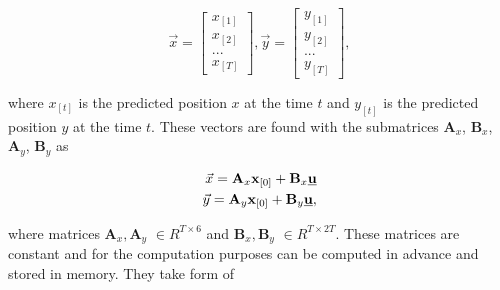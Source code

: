 \documentclass{article}
\begin{document}
\begin{equation}
\vec{x} =
  \begin{bmatrix}
  x_{[1]} \\
  x_{[2]} \\
  ...	   \\
  x_{[T]}
  \end{bmatrix},\vec{y} = \begin{bmatrix}
  y_{[1]} \\
  y_{[2]} \\
  ...	   \\
  y_{[T]}
  \end{bmatrix},
\end{equation}

where $x_{[t]}$ is the predicted position $x$ at the time $t$ and $y_{[t]}$ is the predicted position $y$ at the time $t$.
These vectors are found with the submatrices $\textbf{A}_x$, $\textbf{B}_x$, $\textbf{A}_y$, $\textbf{B}_y$ as

\begin{equation}
\label{eq:pos_matrixes}
\begin{split}
\vec{x} = \textbf{A}_x \textbf{x}_{[0]} + \textbf{B}_x \textbf{\underline{u}} \\
\vec{y} = \textbf{A}_y \textbf{x}_{[0]} + \textbf{B}_y \textbf{\underline{u}}, \\
\end{split}
\end{equation}

where matrices $\textbf{A}_x, \textbf{A}_y$ $\in R^{T \times 6}$ and $\textbf{B}_x, \textbf{B}_y$ $\in R^{T \times 2T}$. These matrices are constant and for the computation purposes can be computed in advance and stored in memory. They take form of 
\end{document}
